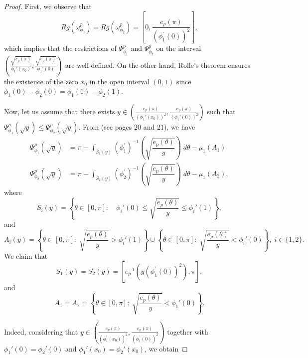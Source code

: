 \documentclass[11pt]{article}
\begin{document}
\begin{proof}
First, we observe that
$$
Rg(\omega^p_{\phi_1})=Rg(\omega^p_{\phi_2})=\left[0,\frac{e_p(\pi)}{(\phi_1^{'}(0))^2}\right],
$$
which implies that the restrictions of $\Psi_{\phi_1}^{p}$ and $\Psi_{\phi_2}^{p}$ on the interval $\left(\frac{\sqrt{e_p(\pi)}}{\phi_1'(x_0)}, \frac{\sqrt{e_p(\pi)}}{\phi_1'(0)}\right)$ are well-defined. On the other hand, Rolle’s theorem ensures the existence of the zero $x_0$ in the open interval $(0,1)$ since $\phi_1(0) - \phi_2(0) = \phi_1(1) - \phi_2(1)$.

Now, let us assume that there exists $y\in\left(\frac{e_p(\pi)}{(\phi_1'(x_0))^2}, \frac{e_p(\pi)}{(\phi_1'(0))^2}\right)$ such that\\ $\Psi_{\phi_1}^{p}(\sqrt{y})\leq \Psi_{\phi_2}^{p}(\sqrt{y})$. From \cite{bianchi2018spectral} (see pages $20$ and $21$), we have 
\begin{equation}\label{eq:therem-dist1-eq1}  
\begin{split}
\Psi_{\phi_1}^{p}(\sqrt{y})&=\pi-\displaystyle\int_{S_1(y)} \left(\phi_1^{'}\right)^{-1}\left(\sqrt{\dfrac{e_p(\theta)}{y}} \right)\;d\theta -\mu_{1}(A_1)
\\
\Psi_{\phi_2}^{p}(\sqrt{y})&=\pi-\displaystyle\int_{S_2(y)}\left(\phi_2^{'}\right)^{-1}\left(\sqrt{\dfrac{e_p(\theta)}{y}} \right)\;d\theta -\mu_{1}(A_2),
\end{split}
\end{equation}
where
$$
S_i(y)=\left\{ \theta\in[0,\pi]:\quad  \phi_i'(0)\leq \sqrt{\dfrac{e_p(\theta)}{y}} \leq\phi_i'(1)    \right\},
$$
and
$$
A_i(y)=\left\{ \theta\in[0,\pi]:\;    \sqrt{\dfrac{e_p(\theta)}{y}}> \phi_i'(1)   \right\}\cup\left\{ \theta\in[0,\pi]:\;    \sqrt{\dfrac{e_p(\theta)}{y}}< \phi_i'(0)   \right\},\;i \in \{1,2\}.
$$
We  claim that
\begin{equation}\label{eq:therem-dist1-eq2}  
S_1(y) = S_2(y) = \left[    e_p^{-1}\left( y\left( \phi_1^{'}(0)   \right)^2 \right),\pi   \right],
\end{equation}
and
\begin{equation}\label{eq:onA}
    A_1=A_2=\left\{ \theta\in[0,\pi]:\;    \sqrt{\dfrac{e_p(\theta)}{y}}< \phi_1'(0)   \right\}.
\end{equation}


Indeed, considering that $y\in \left(\frac{e_p(\pi)}{(\phi_1^{'}(x_0))^2},\frac{e_p(\pi)}{(\phi_1^{'}(0))^2}\right)$ together with $\phi_1'(0)=\phi_2'(0)$ and $\phi_1'(x_0)=\phi_2'(x_0)$, we obtain


\end{proof}
\end{document}
